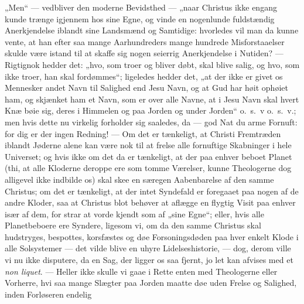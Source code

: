\documentclass[12pt,a4paper]{book}
\begin{document}
„Men“ --- vedbliver den moderne Bevidsthed --- „naar Christus ikke engang kunde
trænge igjennem hos sine Egne, og vinde en nogenlunde fuldstændig Anerkjendelse
iblandt sine Landsmænd og Samtidige: hvorledes vil man da kunne vente, at han
efter saa mange Aarhundreders mange hundrede Misforstaaelser skulde være istand
til at skaffe sig nogen seierrig Anerkjendelse i Nutiden? --- Rigtignok hedder
det: „hvo, som troer og bliver døbt, skal blive salig, og hvo, som ikke troer,
han skal fordømmes“; ligeledes hedder det, „at der ikke er givet os Mennesker
andet Navn til Salighed end Jesu Navn, og at Gud har høit ophøiet ham, og
skjænket ham et Navn, som er over alle Navne, at i Jesu Navn skal hvert Knæ bøie
sig, deres i Himmelen og paa Jorden og under Jorden“ o.\ s.\ v o.\ s.\ v.; men
hvis dette nu virkelig forholder sig
saaledes, da --- god Nat du arme Fornuft: for dig er der ingen Redning! --- Om
det er tænkeligt, at Christi Fremtræden iblandt Jøderne alene kan være nok til at
frelse alle fornuftige Skabninger i hele Universet; og hvis ikke om det da er
tænkeligt, at der paa enhver beboet Planet (thi, at alle Kloderne deroppe ere som
tomme Værelser, kunne Theologerne dog alligevel ikke indbilde os) skal skee en
særegen Aabenbarelse af den samme Christus; om det er tænkeligt, at der intet
Syndefald er foregaaet paa nogen af de andre Kloder, saa at Christus blot behøver
at aflægge en flygtig Visit paa enhver især af dem, for strar at vorde kjendt som
af „sine Egne“; eller, hvis alle Planetbeboere ere Syndere, ligesom vi, om da den
samme Christus skal hudstryges, bespottes, korsfæstes og døe Forsoningsdøden paa
hver enkelt Klode i alle Solsystemer --- det vilde blive en uhyre
Lidelseshistorie, --- dog, derom ville vi nu ikke disputere, da en Sag, der ligger
os saa fjernt, jo let kan afvises med et \textit{non liquet}. --- Heller ikke
skulle vi gaae i Rette enten med Theologerne eller Vorherre, hvi saa mange
Slægter paa Jorden maatte døe uden Frelse og Salighed, inden Forløseren endelig
\end{document}
